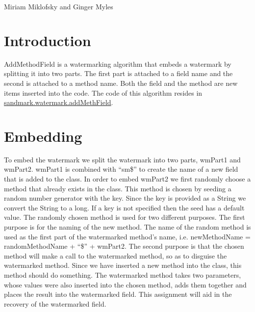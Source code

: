 %
          {Miriam Miklofsky and Ginger Myles}

\section{Introduction}
AddMethodField is a watermarking algorithm that embeds a watermark by splitting it into two parts. The first part is attached to a field name and the second is attached to a method name. Both the field and the method are new items inserted into the code.
The code of this algorithm
resides in \url{sandmark.watermark.addMethField}.


\section{Embedding}
To embed the watermark we split the watermark into two parts, wmPart1 and wmPart2. wmPart1 is combined with ``sm\$'' to create the name of a new field that is added to the class. In order to embed wmPart2 we first randomly choose a method that already exists in the class. This method is chosen by seeding a random number generator with the key. Since the key is provided as a String we convert the String to a long. If a key is not specified then the seed has a default value. The randomly chosen method is used for two different purposes. The first purpose is for the naming of the new method. The name of the random method is used as the first part of the watermarked method's name, i.e. newMethodName = randomMethodName + ``\$'' + wmPart2. The second purpose is that the chosen method will make a call to the watermarked method, so as to disguise the watermarked method. Since we have inserted a new method into the class, this method should do something. The watermarked method takes two parameters, whose values were also inserted into the chosen method, adds them together and places the result into the watermarked field. This assignment will aid in the recovery of the watermarked field.
